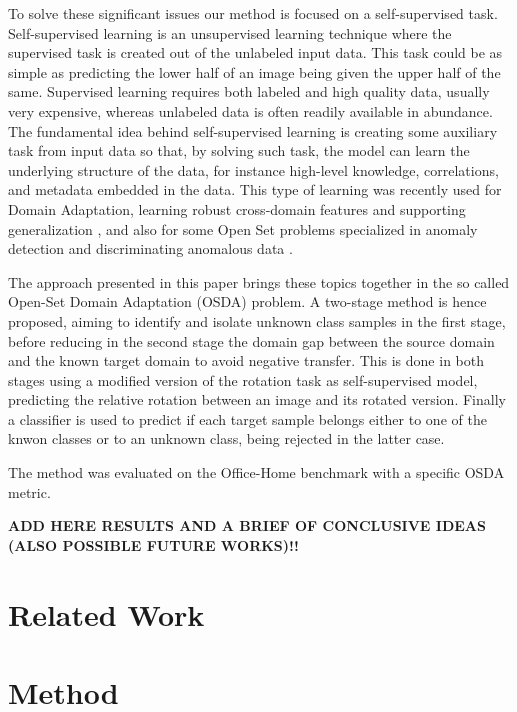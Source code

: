 \documentclass[10pt,twocolumn,letterpaper]{article}
\begin{document}
To solve these significant issues our method is focused on a self-supervised task. 
Self-supervised learning is an unsupervised learning technique where the supervised task is created out of the unlabeled input data. 
This task could be as simple as predicting the lower half of an image being given the upper half of the same.
Supervised learning requires both labeled and high quality data,
usually very expensive, 
whereas unlabeled data is often readily available in abundance.
The fundamental idea behind self-supervised learning is creating some auxiliary task from input data so that,
by solving such task,
the model can learn the underlying structure of the data,
for instance high-level knowledge, correlations, and metadata embedded in the data.
This type of learning was recently used for Domain Adaptation, 
learning robust cross-domain features and supporting generalization \cite{CarlucciJigsaw,SelfSupervisedXu},
and also for some Open Set problems specialized in anomaly detection and discriminating anomalous data \cite{bergman2020classificationbased,dectionGeometric}.

The approach presented in this paper brings these topics together in the so called Open-Set Domain Adaptation (OSDA) problem. 
A two-stage method is hence proposed, 
aiming to identify and isolate unknown class samples in the first stage, 
before reducing in the second stage the domain gap between the source domain and the known target domain to avoid negative transfer.
This is done in both stages using a modified version of the rotation task as self-supervised model,
predicting the relative rotation between an image and its rotated version.
Finally a classifier is used to predict if each target sample belongs either to one of the knwon classes or to an unknown class, 
being rejected in the latter case.

The method was evaluated on the Office-Home benchmark \cite{OfficeHomeDataset} with a specific OSDA metric.

{\bf ADD HERE RESULTS AND A BRIEF OF CONCLUSIVE IDEAS (ALSO POSSIBLE FUTURE WORKS)!!}

\section{Related Work}
\label{sec:relatedwork}


\section{Method}
\label{sec:method}
\end{document}
